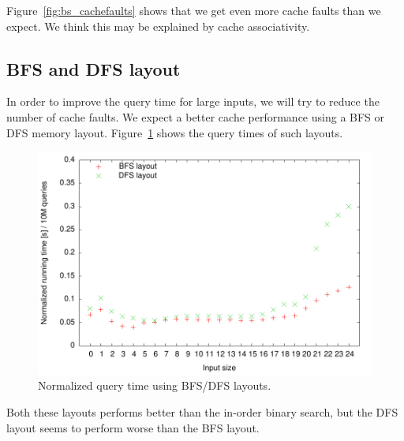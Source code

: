 Figure~\ref{fig:bs_cachefaults} shows that we get even more cache
faults than we expect. We think this may be explained by cache
associativity.

\subsection{BFS and DFS layout}
In order to improve the query time for large inputs, we will try to
reduce the number of cache faults. We expect a better cache
performance using a BFS or DFS memory
layout. Figure~\ref{fig:bfs_dfs_runningtime} shows the query times of
such layouts.

\begin{figure}[h!]
  \label{fig:bfs_dfs_runningtime}
  \centering
  \includegraphics{../week1/plots/outputs/bfs_dfs_runningtime}
  \caption{Normalized query time using BFS/DFS layouts.}
\end{figure}

Both these layouts performs better than the in-order binary search,
but the DFS layout seems to perform worse than the BFS layout.
